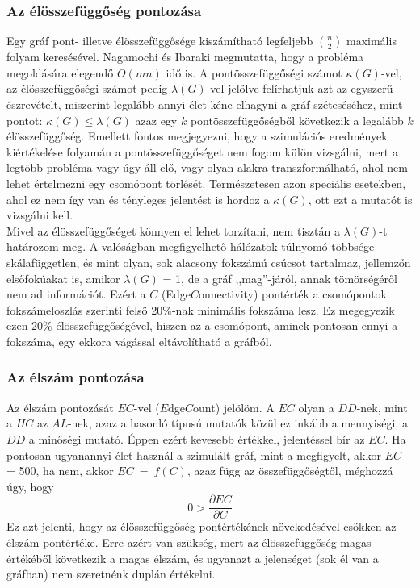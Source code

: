     \subsubsection{Az élösszefüggőség pontozása}\label{elossze}
    Egy gráf pont- illetve élösszefüggősége kiszámítható legfeljebb $\binom{n}{2}$ maximális folyam keresésével. Nagamochi és Ibaraki megmutatta, hogy a probléma megoldására elegendő $O(mn)$ idő is\cite{Nagamochi96}. A pontösszefüggőségi számot $\kappa(G)$-vel, az élösszefüggőségi számot pedig $\lambda(G)$-vel jelölve felírhatjuk azt az egyszerű észrevételt, miszerint legalább annyi élet kéne elhagyni a gráf széteséséhez, mint pontot: $\kappa(G) \leq \lambda(G)$ azaz egy $k$ pontösszefüggőségből következik a legalább $k$ élösszefüggőség. Emellett fontos megjegyezni, hogy a szimulációs eredmények kiértékelése folyamán a pontösszefüggőséget nem fogom külön vizsgálni, mert a legtöbb probléma vagy úgy áll elő, vagy olyan alakra transzformálható, ahol nem lehet értelmezni egy csomópont törlését. Természetesen azon speciális esetekben, ahol ez nem így van és tényleges jelentést is hordoz a $\kappa(G)$, ott ezt a mutatót is vizsgálni kell.\\

    Mivel az élösszefüggőséget könnyen el lehet torzítani, nem tisztán a $\lambda(G)$-t határozom meg. A valóságban megfigyelhető hálózatok túlnyomó többsége skálafüggetlen, és mint olyan, sok alacsony fokszámú csúcsot tartalmaz, jellemzőn elsőfokúakat is, amikor $\lambda(G)$ = 1, de a gráf ,,mag''-járól, annak tömörségéről nem ad információt. Ezért a $C$ (Edge$C$onnectivity) pontérték a csomópontok fokszámeloszlás szerinti felső 20\%-nak minimális fokszáma lesz. Ez megegyezik ezen 20\% élösszefüggőségével, hiszen az a csomópont, aminek pontosan ennyi a fokszáma, egy ekkora vágással eltávolítható a gráfból.

    \subsubsection{Az élszám pontozása}
    Az élszám pontozását $EC$-vel ($E$dge$C$ount) jelölöm. A $EC$ olyan a $DD$-nek, mint a $HC$ az $AL$-nek, azaz a hasonló típusú mutatók közül ez inkább a mennyiségi, a $DD$ a minőségi mutató. Éppen ezért kevesebb értékkel, jelentéssel bír az $EC$. Ha pontosan ugyanannyi élet használ a szimulált gráf, mint a megfigyelt, akkor $EC$ = 500, ha nem, akkor $EC~=~f(C)$, azaz függ az összefüggőségtől, méghozzá úgy, hogy
    $$0 > \frac{\partial EC}{\partial C}$$
    Ez azt jelenti, hogy az élösszefüggőség pontértékének növekedésével csökken az élszám pontértéke. Erre azért van szükség, mert az élösszefüggőség magas értékéből következik a magas élszám, és ugyanazt a jelenséget (sok él van a gráfban) nem szeretnénk duplán értékelni.

